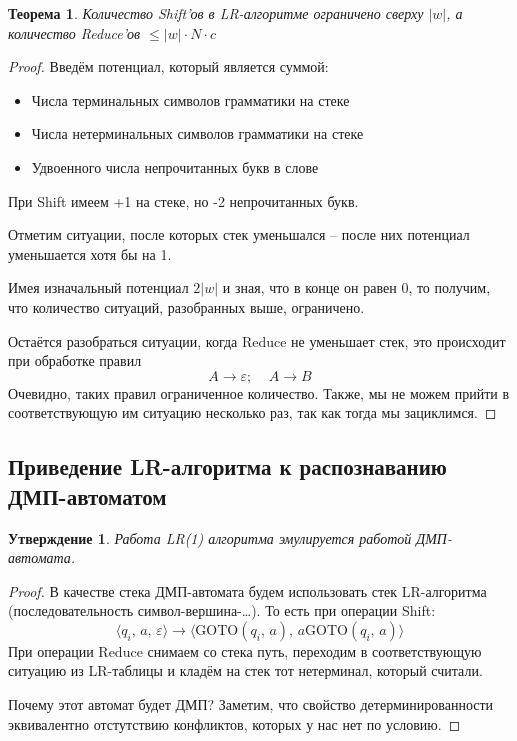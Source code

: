 \documentclass[a4paper,12pt]{article}
\renewcommand{\leq}{\ensuremath{\leqslant}}
\theoremstyle{plain}
\newtheorem{theorem}{Теорема}[subsection]
\newtheorem{proposition}{Утверждение}[subsection]
\theoremstyle{definition}
\theoremstyle{remark}
\begin{document}
\begin{theorem}
	Количество Shift'ов в LR-алгоритме ограничено сверху $\vert w\vert$, а количество Reduce'ов $\leq \vert w\vert\cdot N\cdot c$
\end{theorem}

\begin{proof}
	Введём потенциал, который является суммой:
	\begin{itemize}
		\item Числа терминальных символов грамматики на стеке
		\item Числа нетерминальных символов грамматики на стеке
		\item Удвоенного числа непрочитанных букв в слове
	\end{itemize}
	При Shift имеем +1 на стеке, но -2 непрочитанных букв.

	Отметим ситуации, после которых стек уменьшался -- после них потенциал уменьшается хотя бы на 1.

	Имея изначальный потенциал $2\vert w\vert$ и зная, что в конце он равен $0$, то получим, что количество ситуаций, разобранных выше, ограничено.

	Остаётся разобраться ситуации, когда Reduce не уменьшает стек, это происходит при обработке правил
	\[
		A \to \varepsilon ;\;\;\;\; A \to B
	\]
	Очевидно, таких правил ограниченное количество. Также, мы не можем прийти в соответствующую им ситуацию несколько раз, так как тогда мы зациклимся.
\end{proof}

\subsection{Приведение LR-алгоритма к распознаванию ДМП-автоматом}
\begin{proposition}
	Работа LR(1) алгоритма эмулируется работой ДМП-автомата.
\end{proposition}

\begin{proof}
	В качестве стека ДМП-автомата будем использовать стек LR-алгоритма (последовательность символ-вершина-\dots). То есть при операции Shift:
	\[
		\langle q_i,\, a,\, \varepsilon\rangle \to \langle \text{GOTO}(q_i,\, a),\, a\text{GOTO}(q_i,\, a)\rangle
	\]
	При операции Reduce снимаем со стека путь, переходим в соответствующую ситуацию из LR-таблицы и кладём на стек тот нетерминал, который считали.

	Почему этот автомат будет ДМП? Заметим, что свойство детерминированности эквивалентно отстутствию конфликтов, которых у нас нет по условию.
\end{proof}
\end{document}
